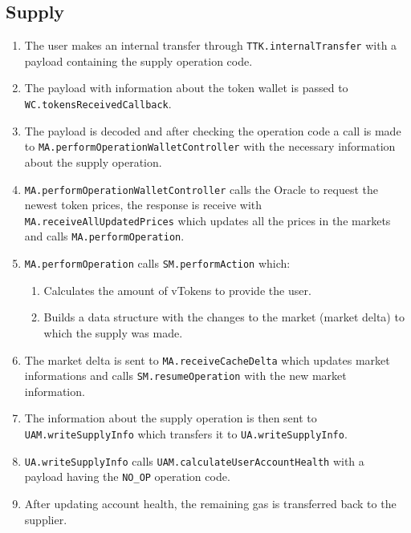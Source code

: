 \subsection{Supply}
\begin{enumerate}
  \item The user makes an internal transfer through \verb|TTK.internalTransfer| with a payload containing the supply operation code.
  \item The payload with information about the token wallet is passed to \\\verb|WC.tokensReceivedCallback|.
  \item The payload is decoded and after checking the operation code a call is made to \verb|MA.performOperationWalletController| with the necessary information about the supply operation.
  \item \verb|MA.performOperationWalletController| calls the Oracle to request the newest token prices, the response is receive with \\\verb|MA.receiveAllUpdatedPrices| which updates all the prices in the markets and calls \verb|MA.performOperation|.
  \item \verb|MA.performOperation| calls \verb|SM.performAction| which:
  \begin{enumerate}[label*=\arabic*.]
    \item Calculates the amount of vTokens to provide the user.
    \item Builds a data structure with the changes to the market (market delta) to which the supply was made.
  \end{enumerate}
  \item The market delta is sent to \verb|MA.receiveCacheDelta| which updates market informations and calls \verb|SM.resumeOperation| with the new market information.
  \item The information about the supply operation is then sent to \\\verb|UAM.writeSupplyInfo| which transfers it to \verb|UA.writeSupplyInfo|.
  \item \verb|UA.writeSupplyInfo| calls \verb|UAM.calculateUserAccountHealth| with a \\payload having the \verb|NO_OP| operation code.
  \item After updating account health, the remaining gas is transferred back to the supplier.
\end{enumerate}

